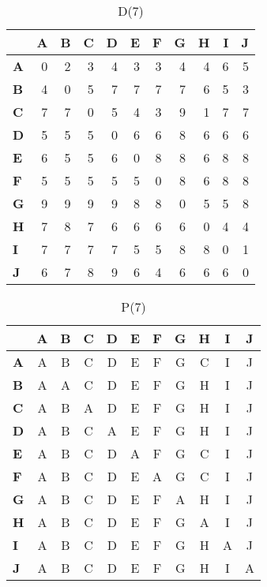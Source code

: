 \documentclass{article}
\begin{document}
\begin{table}[H]\centering
\caption{D(7)}
\begin{tabular}{l r r r r r r r r r r}
\toprule
 & \textbf{A} & \textbf{B} & \textbf{C} & \textbf{D} & \textbf{E} & \textbf{F} & \textbf{G} & \textbf{H} & \textbf{I} & \textbf{J}\\\midrule
\textbf{A} & 0 & 2 & 3 & 4 & 3 & 3 & 4 & 4 & 6 & 5 \\
\textbf{B} & 4 & 0 & 5 & 7 & 7 & 7 & 7 & 6 & 5 & 3 \\
\textbf{C} & 7 & 7 & 0 & 5 & 4 & 3 & 9 & 1 & 7 & 7 \\
\textbf{D} & 5 & 5 & 5 & 0 & 6 & 6 & 8 & 6 & 6 & 6 \\
\textbf{E} & 6 & 5 & 5 & 6 & 0 & 8 & 8 & 6 & 8 & 8 \\
\textbf{F} & 5 & 5 & 5 & 5 & 5 & 0 & 8 & 6 & 8 & 8 \\
\textbf{G} & 9 & 9 & 9 & 9 & 8 & 8 & 0 & 5 & 5 & 8 \\
\textbf{H} & 7 & 8 & 7 & 6 & 6 & 6 & 6 & 0 & 4 & 4 \\
\textbf{I} & 7 & 7 & 7 & 7 & 5 & 5 & 8 & 8 & 0 & 1 \\
\textbf{J} & 6 & 7 & 8 & 9 & 6 & 4 & 6 & 6 & 6 & 0 \\
\bottomrule
\end{tabular}
\end{table}

\begin{table}[H]\centering
\caption{P(7)}
\begin{tabular}{l c c c c c c c c c c}
\toprule
 & \textbf{A} & \textbf{B} & \textbf{C} & \textbf{D} & \textbf{E} & \textbf{F} & \textbf{G} & \textbf{H} & \textbf{I} & \textbf{J}\\\midrule
\textbf{A} & A & B & C & D & E & F & G & C & I & J \\
\textbf{B} & A & A & C & D & E & F & G & H & I & J \\
\textbf{C} & A & B & A & D & E & F & G & H & I & J \\
\textbf{D} & A & B & C & A & E & F & G & H & I & J \\
\textbf{E} & A & B & C & D & A & F & G & C & I & J \\
\textbf{F} & A & B & C & D & E & A & G & C & I & J \\
\textbf{G} & A & B & C & D & E & F & A & H & I & J \\
\textbf{H} & A & B & C & D & E & F & G & A & I & J \\
\textbf{I} & A & B & C & D & E & F & G & H & A & J \\
\textbf{J} & A & B & C & D & E & F & G & H & I & A \\
\bottomrule
\end{tabular}
\end{table}
\end{document}
